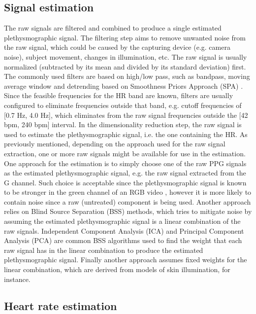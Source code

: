 \subsection{Signal estimation}

The raw signals are filtered and combined to produce a single estimated plethysmographic signal. The filtering step aims to remove unwanted noise from the raw signal, which could be caused by the capturing device (e.g. camera noise), subject movement, changes in illumination, etc. The raw signal is usually normalized (subtracted by its mean and divided by its standard deviation) first. The commonly used filters are based on high/low pass, such as bandpass, moving average window and detrending based on Smoothness Priors Approach (SPA) \parencite{eleuteri2012efficient}. Since the feasible frequencies for the HR band are known, filters are usually configured to eliminate frequencies outside that band, e.g. cutoff frequencies of [0.7 Hz, 4.0 Hz], which eliminates from the raw signal frequencies outside the [42 bpm, 240 bpm] interval. In the dimensionality reduction step, the raw signal is used to estimate the plethysmographic signal, i.e. the one containing the HR. As previously mentioned, depending on the approach used for the raw signal extraction, one or more raw signals might be available for use in the estimation. One approach for the estimation is to simply choose one of the raw PPG signals as the estimated plethysmographic signal, e.g. the raw signal extracted from the G channel. Such choice is acceptable since the plethysmographic signal is known to be stronger in the green channel of an RGB video \parencite{verkruysse2008remote}, however it is more likely to contain noise since a raw (untreated) component is being used. Another approach relies on Blind Source Separation (BSS) methods, which tries to mitigate noise by assuming the estimated plethysmographic signal is a linear combination of the raw signals. Independent Component Analysis (ICA) \parencite{hyvarinen2000independent} and Principal Component Analysis (PCA) \parencite{jolliffe2002principal} are common BSS algorithms used to find the weight that each raw signal has in the linear combination to produce the estimated plethysmographic signal. Finally another approach assumes fixed weights for the linear combination, which are derived from models of skin illumination, for instance.

\subsection{Heart rate estimation}

